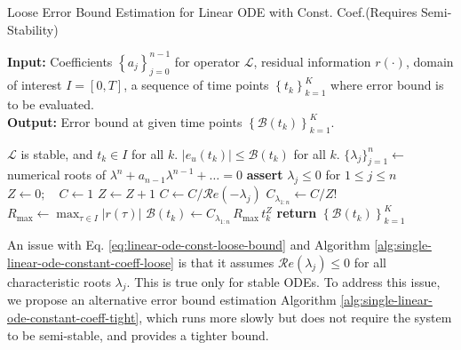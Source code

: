 \documentclass[accepted]{uai2023}
\newcommand{\Err}{e}
\newcommand{\Bound}{\mathcal{B}}
\renewcommand{\L}{\mathcal{L}}
\renewcommand{\Re}[1]{\mathcal{R}e\left(#1\right)}
\begin{document}
    \begin{algorithm}
        \small
        \caption{Loose Error Bound Estimation for Linear ODE with Const. Coef.\quad (Requires Semi-Stability)}\label{alg:single-linear-ode-constant-coeff-loose}
        \textbf{Input:} Coefficients $\left\{a_j\right\}_{j=0}^{n-1}$ for operator $\L$, residual information $r(\cdot)$, domain of interest $I = [0, T]$, a sequence of time points $\left\{t_k\right\}_{k=1}^{K}$ where error bound is to be evaluated.\\
        \textbf{Output:} Error bound at given time points $\left\{\Bound(t_k)\right\}_{k=1}^{K}$.

        \begin{algorithmic}
            \Require $\L$ is stable, and $t_k \in I$ for all $k$.
            \Ensure $\left|\Err_u(t_k)\right| \leq \Bound(t_k)$ for all $k$. 
            \vspace{0.5em}
            \State $\{\lambda_j\}_{j=1}^{n} \gets$ numerical roots of $\lambda^n+a_{n-1}\lambda^{n-1}+\dots=0$ 
            \State \textbf{assert} $\lambda_j \leq 0$ for $1 \leq j \leq n$ 
            \State $Z \gets 0; \quad C \gets 1$
                \If{$\Re{\lambda_j} = 0$}
                    \State $Z \gets Z + 1$
                \Else
                    \State $C \gets C / \Re{-\lambda_j}$
                \EndIf
            \EndFor
            \State $C_{\lambda_{1:n}}\gets C / Z!$
            \State $R_{\max} \gets \max_{\tau \in I} |r(\tau)|$ 
                \State $\Bound(t_k) \gets C_{\lambda_{1:n}}\, R_{\max}\, t_k^{Z} $
            \EndFor
            \State \textbf{return} $\left\{\Bound(t_k)\right\}_{k=1}^{K}$
        \end{algorithmic}
    \end{algorithm}

    An issue with Eq. \ref{eq:linear-ode-const-loose-bound} and Algorithm \ref{alg:single-linear-ode-constant-coeff-loose} is that it assumes $\Re{\lambda_j} \leq 0$ for all characteristic roots $\lambda_j$. 
    This is true only for stable ODEs. 
    To address this issue, we propose an alternative error bound estimation Algorithm \ref{alg:single-linear-ode-constant-coeff-tight}, which runs more slowly but does not require the system to be semi-stable, and provides a tighter bound.
\end{document}
